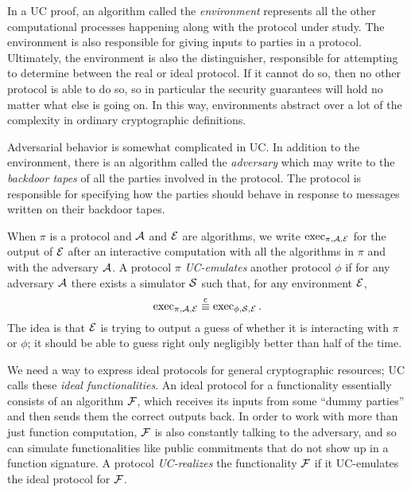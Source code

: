 In a UC proof, an algorithm called the \emph{environment} represents all the
other computational processes happening along with the protocol under study. The
environment is also responsible for giving inputs to parties in a protocol.
Ultimately, the environment is also the distinguisher, responsible for
attempting to determine between the real or ideal protocol. If it cannot do so,
then no other protocol is able to do so, so in particular the security
guarantees will hold no matter what else is going on. In this way, environments
abstract over a lot of the complexity in ordinary cryptographic definitions.

Adversarial behavior is somewhat complicated in UC. In addition to the
environment, there is an algorithm called the \emph{adversary} which may write
to the \emph{backdoor tapes} of all the parties involved in the protocol. The
protocol is responsible for specifying how the parties should behave in response
to messages written on their backdoor tapes.

When $\pi$ is a protocol and $\mathcal{A}$ and $\mathcal{E}$ are algorithms, we write
$\operatorname{exec}_{\pi,\mathcal{A},\mathcal{E}}$ for the output of $\mathcal{E}$ after an interactive computation
with all the algorithms in $\pi$ and with the adversary $\mathcal{A}$. A protocol $\pi$
\emph{UC-emulates} another protocol $\phi$ if for any adversary $\mathcal{A}$ there
exists a simulator $\mathcal{S}$ such that, for any environment $\mathcal{E}$, \[
  \operatorname{exec}_{\pi,\mathcal{A},\mathcal{E}}\overset{\text{c}}{\equiv} \operatorname{exec}_{\phi,\mathcal{S},\mathcal{E}}.
\]
The idea is that $\mathcal{E}$ is trying to output a guess of whether it is interacting
with $\pi$ or $\phi$; it should be able to guess right only negligibly better
than half of the time.

We need a way to express ideal protocols for general cryptographic resources; UC
calls these \emph{ideal functionalities}. An ideal protocol for a functionality
essentially consists of an algorithm $\mathcal{F}$, which receives its inputs from some
``dummy parties'' and then sends them the correct outputs back. In order to work
with more than just function computation, $\mathcal{F}$ is also constantly talking to
the adversary, and so can simulate functionalities like public commitments that
do not show up in a function signature. A protocol \emph{UC-realizes} the
functionality $\mathcal{F}$ if it UC-emulates the ideal protocol for $\mathcal{F}$.

